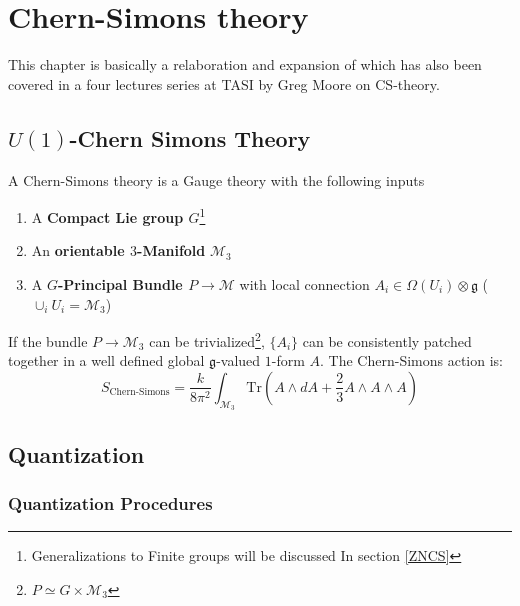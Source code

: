 \documentclass[11pt]{article}
\theoremstyle{definition}
\numberwithin{equation}{section}
\begin{document}
\section{Chern-Simons theory}
This chapter is basically a relaboration and expansion of \cite[Chapter 2]{Moor} which has also been covered in a four lectures series at TASI by Greg Moore on CS-theory. 

\subsection{\texorpdfstring{$U(1)$-Chern Simons Theory}{CS}}
A Chern-Simons theory is a Gauge theory with the following inputs
\begin{enumerate}
    \item A \textbf{Compact Lie group $G$}\footnote{Generalizations to Finite groups will be discussed In section \ref{ZNCS}}
    \item An \textbf{orientable $3$-Manifold} $\mathcal{M}_3$
    \item A \textbf{$G$-Principal Bundle $P \to \mathcal{M}$} with local connection $A_i \in \Omega(U_i) \otimes \mathfrak{g}$ ($\cup_{i} U_i = \mathcal{M}_3$)
\end{enumerate}
If the bundle $P \to \mathcal{M}_3$ can be trivialized\footnote{$P \simeq G \times \mathcal{M}_3$}, $\{A_i\}$ can be consistently patched together in a well defined global $\mathfrak{g}$-valued $1$-form $A$. The Chern-Simons action is:
\begin{equation}
    S_{\text{Chern-Simons}} = \frac{k}{8 \pi^2} \int_{\mathcal{M}_3} \text{Tr}(A \wedge d A + \frac{2}{3} A \wedge A \wedge A)
\end{equation}

\subsection{Quantization}
\subsubsection{Quantization Procedures}
\end{document}
